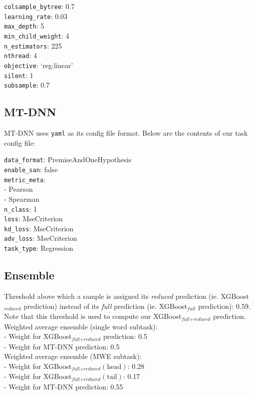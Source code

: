 \documentclass[11pt,a4paper]{article}
\begin{document}
\indent \texttt{colsample\_bytree}: 0.7\\
\indent \texttt{learning\_rate}: 0.03\\
\indent \texttt{max\_depth}: 5\\
\indent \texttt{min\_child\_weight}: 4\\
\indent \texttt{n\_estimators}: 225\\
\indent \texttt{nthread}: 4\\
\indent \texttt{objective}: `reg:linear'\\
\indent \texttt{silent}: 1\\
\indent \texttt{subsample}: 0.7

\subsection{MT-DNN}

MT-DNN uses \texttt{yaml} as its config file format. Below are the contents of our task config file:

\indent \texttt{data\_format}: PremiseAndOneHypothesis\\
\indent \texttt{enable\_san}: false\\
\indent \texttt{metric\_meta}:\\
\indent - Pearson\\
\indent - Spearman\\
\indent \texttt{n\_class}: 1\\
\indent \texttt{loss}: MseCriterion\\
\indent \texttt{kd\_loss}: MseCriterion\\
\indent \texttt{adv\_loss}: MseCriterion\\
\indent \texttt{task\_type}: Regression

\subsection{Ensemble}

Threshold above which a sample is assigned its \textit{reduced} prediction (ie. XGBoost$_\textit{reduced}$ prediction) instead of its \textit{full} prediction (ie. XGBoost$_\textit{full}$ prediction): 0.59. Note that this threshold is used to compute our XGBoost$
_{\textit{full}+\textit{reduced}}$ prediction.\\

\noindent Weighted average ensemble (single word subtask):\\
- Weight for XGBoost$_{\textit{full}+\textit{reduced}}$ prediction: 0.5\\
- Weight for MT-DNN prediction: 0.5\\

\noindent Weighted average ensemble (MWE subtask):\\
- Weight for XGBoost$_{\textit{full}+\textit{reduced}}(\text{head})$: 0.28 \\
- Weight for XGBoost$_{\textit{full}+\textit{reduced}}(\text{tail})$: 0.17 \\
- Weight for MT-DNN prediction: 0.55\\
\end{document}
